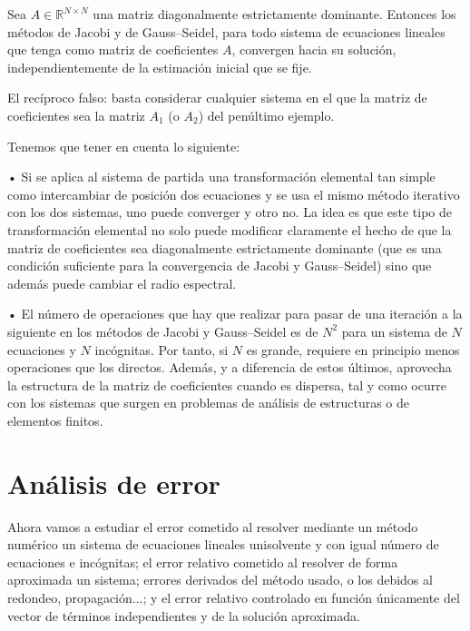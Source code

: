 \begin{nprop}
Sea $A \in \mathbb{R}^{N \times N}$ una matriz diagonalmente estrictamente dominante. Entonces los métodos de Jacobi y de Gauss–Seidel, para todo sistema de ecuaciones lineales que tenga como matriz de coeficientes $A$, convergen hacia su solución, independientemente de la estimación inicial que se fije.
\end{nprop}

El recíproco falso: basta considerar cualquier sistema en el que la matriz de
coeficientes sea la matriz $A_1$ (o $A_2$) del penúltimo ejemplo.

\begin{nota}
Tenemos que tener en cuenta lo siguiente:
	\begin{nlist}
	\item[•] Si se aplica al sistema de partida una transformación elemental tan simple como intercambiar de posición dos ecuaciones y se usa el mismo método iterativo con los dos sistemas, uno puede converger y otro no. La idea es que este tipo de transformación elemental no solo puede modificar claramente el hecho de que la matriz de coeficientes sea diagonalmente estrictamente dominante (que es una condición suficiente para la convergencia de Jacobi y Gauss–Seidel) sino que además puede cambiar el radio espectral.
	\item[•] El número de operaciones que hay que realizar para pasar de una iteración a la siguiente en los métodos de Jacobi y Gauss–Seidel es de $N^2$ para un sistema de $N$ ecuaciones y $N$ incógnitas. Por tanto, si $N$ es grande, requiere en principio menos operaciones que los directos. Además, y a diferencia de estos últimos, aprovecha la estructura de la matriz de coeficientes cuando es dispersa, tal y como ocurre con los sistemas que surgen en problemas de análisis de estructuras o de elementos finitos.
	\end{nlist}
\end{nota}

\section{Análisis de error}
Ahora vamos a estudiar el error cometido al resolver mediante un método numérico un sistema de ecuaciones lineales unisolvente y con igual número de ecuaciones e incógnitas; el error relativo cometido al resolver de forma aproximada un sistema; errores derivados del método usado, o los debidos al redondeo, propagación...; y el error relativo controlado en función únicamente del vector de términos independientes y de la solución aproximada.


